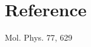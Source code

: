 \documentclass{article}
\begin{document}
\begin{itemize}
\end{itemize}

\section{Reference}
Mol. Phys. 77, 629
\end{document}
